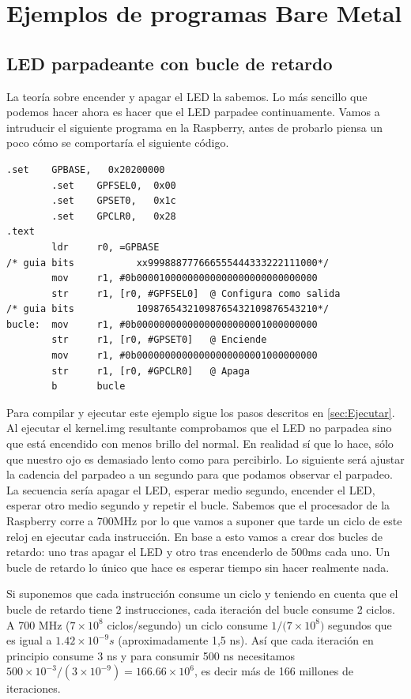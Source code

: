 \section{Ejemplos de programas Bare Metal}

\subsection{LED parpadeante con bucle de retardo}

La teoría sobre encender y apagar el LED la sabemos. Lo más sencillo que podemos hacer ahora
es hacer que el LED parpadee continuamente. Vamos a intruducir el siguiente programa en la
Raspberry, antes de probarlo piensa un poco cómo se comportaría el siguiente código.

\begin{lstlisting}[caption={esbn3.s},label={lst:codigoPract4_3}]
        .set    GPBASE,   0x20200000
        .set    GPFSEL0,  0x00
        .set    GPSET0,   0x1c
        .set    GPCLR0,   0x28
.text
        ldr     r0, =GPBASE
/* guia bits           xx999888777666555444333222111000*/
        mov     r1, #0b00001000000000000000000000000000
        str     r1, [r0, #GPFSEL0]  @ Configura como salida
/* guia bits           10987654321098765432109876543210*/
bucle:  mov     r1, #0b00000000000000000000001000000000
        str     r1, [r0, #GPSET0]   @ Enciende
        mov     r1, #0b00000000000000000000001000000000
        str     r1, [r0, #GPCLR0]   @ Apaga
        b       bucle
\end{lstlisting}

Para compilar y ejecutar este ejemplo sigue los pasos descritos en \ref{sec:Ejecutar}.
Al ejecutar el kernel.img resultante comprobamos que el LED no parpadea sino que está encendido con menos brillo del normal.
En realidad sí que lo hace, sólo que nuestro ojo es demasiado lento como para percibirlo.
Lo siguiente será ajustar la cadencia del parpadeo a un segundo para que podamos observar
el parpadeo. La secuencia sería apagar el LED, esperar medio segundo, encender el LED,
esperar otro medio segundo y repetir el bucle. Sabemos que el procesador de la Raspberry
corre a 700MHz por lo que vamos a suponer que tarde un ciclo de este reloj en ejecutar
cada instrucción. En base a esto vamos a crear dos bucles de retardo: uno tras apagar el LED
y otro tras encenderlo de 500ms cada uno. Un bucle de retardo lo único que hace es esperar
tiempo sin hacer realmente nada.

Si suponemos que cada instrucción consume un ciclo y teniendo en cuenta que el bucle de
retardo tiene 2 instrucciones, cada iteración del bucle consume 2 ciclos. A 700 MHz
($7\times10^{8}$ ciclos/segundo) un ciclo consume $1/({7\times10^{8})}$ segundos que es igual a
$1.42\times10^{-9} s$ (aproximadamente 1,5 ns). Así que cada iteración en principio
consume 3 ns y para consumir 500 ns necesitamos ${500\times10^{-3}/({3\times10^{-9}})}=166.66\times10^{6}$,
es decir más de 166 millones de iteraciones.

